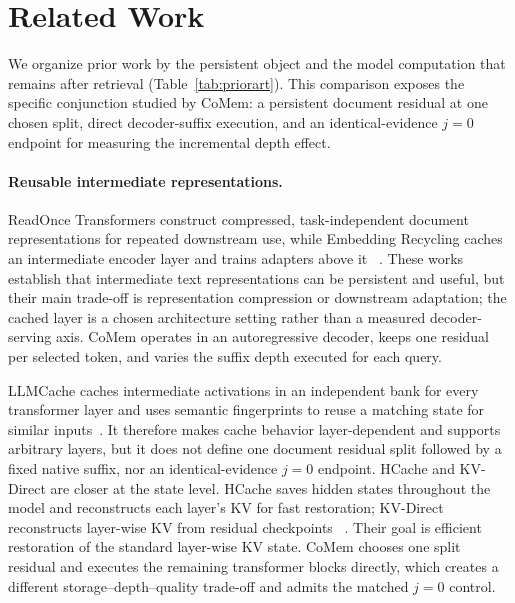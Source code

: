 \section{Related Work}
\label{sec:related}

We organize prior work by the persistent object and the model computation that
remains after retrieval (Table~\ref{tab:priorart}). This comparison exposes the
specific conjunction studied by CoMem: a persistent document residual at one
chosen split, direct decoder-suffix execution, and an identical-evidence
$j{=}0$ endpoint for measuring the incremental depth effect.



\paragraph{Reusable intermediate representations.}
ReadOnce Transformers construct compressed, task-independent document
representations for repeated downstream use, while Embedding Recycling caches
an intermediate encoder layer and trains adapters above it
~\citep{readonce,embeddingrecycling}. These works establish that intermediate
text representations can be persistent and useful, but their main trade-off is
representation compression or downstream adaptation; the cached layer is a
chosen architecture setting rather than a measured decoder-serving axis.
CoMem operates in an autoregressive decoder, keeps one residual per selected
token, and varies the suffix depth executed for each query.

LLMCache caches intermediate activations in an independent bank for every
transformer layer and uses semantic fingerprints to reuse a matching state for
similar inputs~\citep{llmcache}. It therefore makes cache behavior
layer-dependent and supports arbitrary layers, but it does not define one
document residual split followed by a fixed native suffix, nor an
identical-evidence $j{=}0$ endpoint. HCache and KV-Direct are closer at the state
level. HCache saves hidden states
throughout the model and reconstructs each layer's KV for fast restoration;
KV-Direct reconstructs layer-wise KV from residual checkpoints
~\citep{hcache,kvdirect}. Their goal is efficient restoration of the standard
layer-wise KV state. CoMem chooses one split residual and executes the remaining
transformer blocks directly, which creates a different storage--depth--quality
trade-off and admits the matched $j{=}0$ control.

